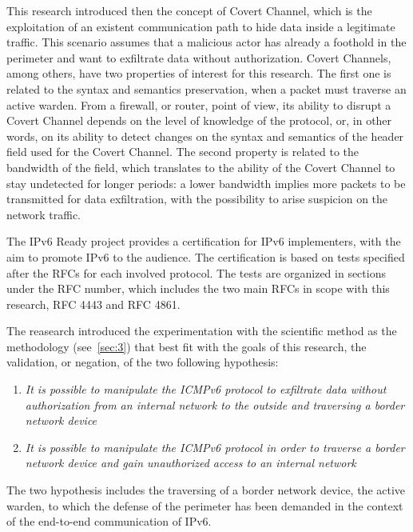 \documentclass[12pt]{article}
\begin{document}
This research introduced then the concept of Covert Channel, which is the exploitation of an existent communication path to hide data inside a legitimate traffic. This scenario assumes that a malicious actor has already a foothold in the perimeter and want to exfiltrate data without authorization. Covert Channels, among others, have two properties of interest for this research. The first one is related to the syntax and semantics preservation, when a packet must traverse an active warden. From a firewall, or router, point of view, its ability to disrupt a Covert Channel depends on the level of knowledge of the protocol, or, in other words, on its ability to detect changes on the syntax and semantics of the header field used for the Covert Channel. The second property is related to the bandwidth of the field, which translates to the ability of the Covert Channel to stay undetected for longer periods: a lower bandwidth implies more packets to be transmitted for data exfiltration, with the possibility to arise suspicion on the network traffic.

The IPv6 Ready project provides a certification for IPv6 implementers, with the aim to promote IPv6 to the audience. The certification is based on tests specified after the RFCs for each involved protocol. The tests are organized in sections under the RFC number, which includes the two main RFCs in scope with this research, RFC 4443 and RFC 4861.

The reasearch introduced the experimentation with the scientific method as the methodology (see~\cref{sec:3}) that best fit with the goals of this research, the validation, or negation, of the two following hypothesis:
\begin{enumerate}[noitemsep,topsep=0pt,partopsep=0pt]
 \item  \textit{It is possible to manipulate the ICMPv6 protocol to exfiltrate data without authorization from an internal network to the outside and traversing a border network device}
 \item \textit{It is possible to manipulate the ICMPv6 protocol in order to traverse a border network device and gain unauthorized access to an internal network}
\end{enumerate}

The two hypothesis includes the traversing of a border network device, the active warden, to which the defense of the perimeter has been demanded in the context of the end-to-end communication of IPv6.
\end{document}

